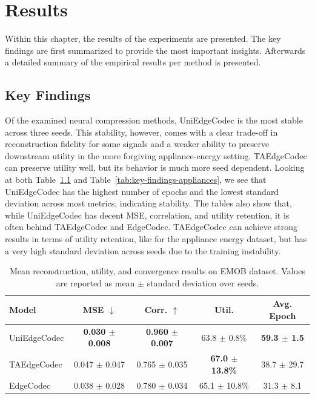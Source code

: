 \chapter{Results}
\label{chap:results}

Within this chapter, the results of the experiments are presented. The key findings are first summarized to provide the most important insights. Afterwards a detailed summary of the empirical results per method is presented.

\section{Key Findings}

Of the examined neural compression methods, UniEdgeCodec is the most stable across three seeds. This stability, however, comes with a clear trade-off in reconstruction fidelity for some signals and a weaker ability to preserve downstream utility in the more forgiving appliance-energy setting. TAEdgeCodec can preserve utility well, but its behavior is much more seed dependent. Looking at both Table~\ref{tab:key-findings-emob} and Table~\ref{tab:key-findings-appliances}, we see that UniEdgeCodec has the highest number of epochs and the lowest standard deviation across most metrics, indicating stability. The tables also show that, while UniEdgeCodec has decent MSE, correlation, and utility retention, it is often behind TAEdgeCodec and EdgeCodec. TAEdgeCodec can achieve strong results in terms of utility retention, like for the appliance energy dataset, but has a very high standard deviation across seeds due to the training instability. 

\begin{table}[htbp]
\centering
\small
\caption{Mean reconstruction, utility, and convergence results on EMOB dataset. Values are reported as mean $\pm$ standard deviation over seeds.}
\label{tab:key-findings-emob}
\begin{tabular}{lcccc}
\toprule
\textbf{Model} & \textbf{MSE} $\downarrow$ & \textbf{Corr.} $\uparrow$ & \textbf{Util.} & \textbf{Avg. Epoch} \\
\midrule
UniEdgeCodec & \textbf{0.030 $\pm$ 0.008} & \textbf{0.960 $\pm$ 0.007} & 63.8 $\pm$ 0.8\% & \textbf{59.3 $\pm$ 1.5} \\
TAEdgeCodec  & 0.047 $\pm$ 0.047 & 0.765 $\pm$ 0.035 & \textbf{67.0 $\pm$ 13.8\%} & 38.7 $\pm$ 29.7 \\
EdgeCodec    & 0.038 $\pm$ 0.028 & 0.780 $\pm$ 0.034 & 65.1 $\pm$ 10.8\% & 31.3 $\pm$ 8.1 \\
\bottomrule
\end{tabular}
\end{table}

